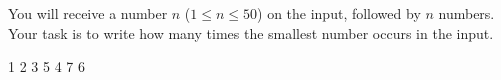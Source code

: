 




You will receive a number $n$ ($1\leq n\leq 50$) on the input, followed by $n$ numbers. Your task is to write how many times the smallest number occurs in the input.

1 2 3 5 4 7 6
\koniec


